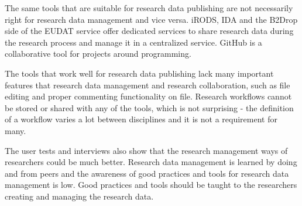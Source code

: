 The same tools that are suitable for research data publishing are not
necessarily right for research data management and vice versa. iRODS, IDA
and the B2Drop side of the EUDAT service offer dedicated services to share research data during
the research process and manage it in a centralized service. GitHub is a
collaborative tool for projects around programming.

The tools that work well for research data publishing lack many important
features that research data management and research collaboration, such
as file editing and proper commenting functionality on file. Research workflows
cannot be stored or shared with any of the tools, which is not surprising - the
definition of a workflow varies a lot between disciplines and it is not a
requirement for many.

The user tests and interviews also show that the research management ways
of researchers could be much better. Research data management is learned
by doing and from peers and the awareness of good practices and tools for
research data management is low. Good practices and tools should be taught to
the researchers creating and managing the research data.

